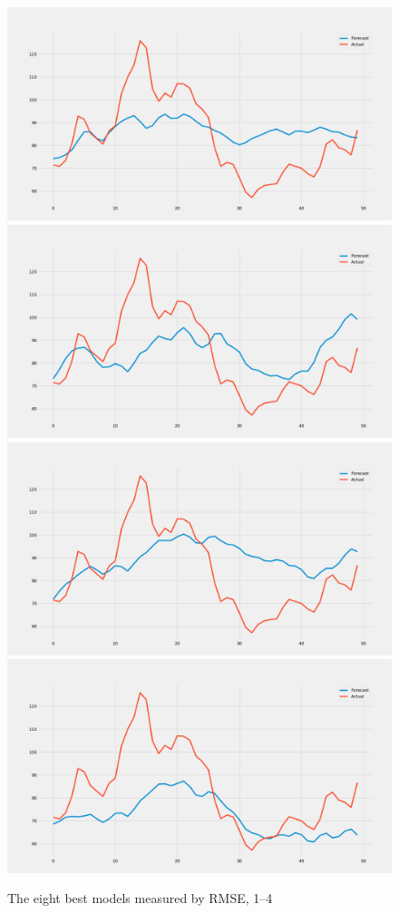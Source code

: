 \begin{figure}[H]
    \includegraphics[width=.48\textwidth]{../data/Figures/Neural networks/ForLoop_Tensor/plotModel_186.png}\hfill
    \includegraphics[width=.48\textwidth]{../data/Figures/Neural networks/ForLoop_Tensor/plotModel_72.png}\hfill
    \\[\smallskipamount]
    \includegraphics[width=.48\textwidth]{../data/Figures/Neural networks/ForLoop_Tensor/plotmodel_286.png}\hfill
    \includegraphics[width=.48\textwidth]{../data/Figures/Neural networks/ForLoop_Tensor/plotmodel_46.png}
    \caption[The eight best models measured by RMSE, 1--4]{The eight best models measured by RMSE, 1--4}\label{fig:best_models14}
\end{figure}

